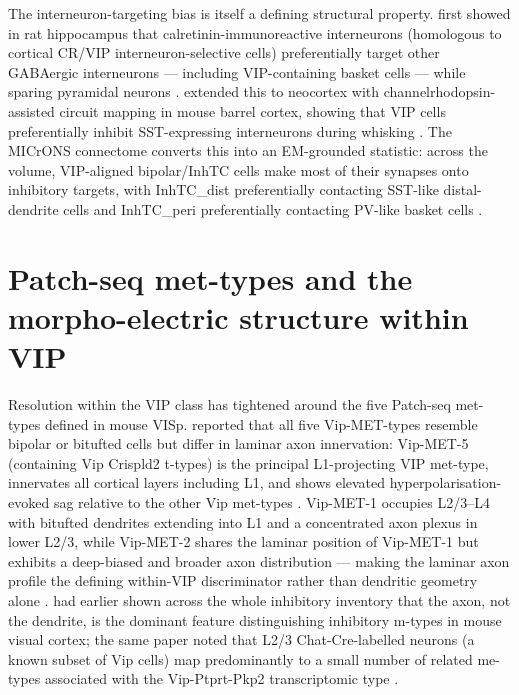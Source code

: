 \documentclass[11pt]{article}
\begin{document}
The interneuron-targeting bias is itself a defining structural property. \citet{Gulyas1996} first showed in rat hippocampus that calretinin-immunoreactive interneurons (homologous to cortical CR/VIP interneuron-selective cells) preferentially target other GABAergic interneurons --- including VIP-containing basket cells --- while sparing pyramidal neurons \citep{Gulyas1996, Lee2013, Schneidermizell2025, Gamlin2025}. \citet{Lee2013} extended this to neocortex with channelrhodopsin-assisted circuit mapping in mouse barrel cortex, showing that VIP cells preferentially inhibit SST-expressing interneurons during whisking \citep{Lee2013, Gulyas1996, Schneidermizell2025, Pronneke2015}. The MICrONS connectome converts this into an EM-grounded statistic: across the volume, VIP-aligned bipolar/InhTC cells make most of their synapses onto inhibitory targets, with InhTC\_dist preferentially contacting SST-like distal-dendrite cells and InhTC\_peri preferentially contacting PV-like basket cells \citep{Schneidermizell2025, Elabbady2025, Gamlin2025, Lee2013}.

\section{Patch-seq met-types and the morpho-electric structure within VIP}

Resolution within the VIP class has tightened around the five Patch-seq met-types defined in mouse VISp. \citet{Gouwens2020a} reported that all five Vip-MET-types resemble bipolar or bitufted cells but differ in laminar axon innervation: Vip-MET-5 (containing Vip Crispld2 t-types) is the principal L1-projecting VIP met-type, innervates all cortical layers including L1, and shows elevated hyperpolarisation-evoked sag relative to the other Vip met-types \citep{Gouwens2020a, Gouwens2019, Chartrand2023}. Vip-MET-1 occupies L2/3--L4 with bitufted dendrites extending into L1 and a concentrated axon plexus in lower L2/3, while Vip-MET-2 shares the laminar position of Vip-MET-1 but exhibits a deep-biased and broader axon distribution --- making the laminar axon profile the defining within-VIP discriminator rather than dendritic geometry alone \citep{Gouwens2020a, Gouwens2019, Schneidermizell2025, Gamlin2025}. \citet{Gouwens2019} had earlier shown across the whole inhibitory inventory that the axon, not the dendrite, is the dominant feature distinguishing inhibitory m-types in mouse visual cortex; the same paper noted that L2/3 Chat-Cre-labelled neurons (a known subset of Vip cells) map predominantly to a small number of related me-types associated with the Vip-Ptprt-Pkp2 transcriptomic type \citep{Gouwens2019, Gouwens2020a, Yayon2023, Wong2022}.
\end{document}
